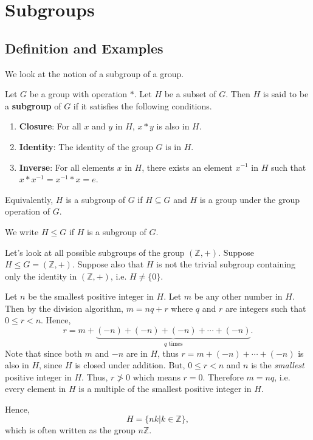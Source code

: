 \chapter{Subgroups}
\section{Definition and Examples}
We look at the notion of a subgroup of a group.
\begin{definition}
    Let $G$ be a group with operation $\ast$. Let $H$ be a subset of $G$. Then $H$ is said to be a \textbf{subgroup} of $G$ if it satisfies the following conditions.
    \begin{enumerate}
        \item \textbf{Closure}: For all $x$ and $y$ in $H$, $x \ast y$ is also in $H$.
        \item \textbf{Identity}: The identity of the group $G$ is in $H$.
        \item \textbf{Inverse}: For all elements $x$ in $H$, there exists an element $x^{-1}$ in $H$ such that $x \ast x^{-1} = x^{-1} \ast x = e$.
    \end{enumerate}
\end{definition}
\begin{remark}
    Equivalently, $H$ is a subgroup of $G$ if $H \subseteq G$ and $H$ is a group under the group operation of $G$.
\end{remark}
We write $H \leq G$ if $H$ is a subgroup of $G$.

\begin{example}
    Let's look at all possible subgroups of the group $(\mathbb{Z}, +)$. Suppose $H \leq G = (\mathbb{Z}, +)$. Suppose also that $H$ is not the trivial subgroup containing only the identity in $(\mathbb{Z}, +)$, i.e. $H \neq \{0\}$.

    Let $n$ be the smallest positive integer in $H$. Let $m$ be any other number in $H$. Then by the division algorithm, $m = nq + r$ where $q$ and $r$ are integers such that $0 \leq r < n$. Hence,
    \[
        r = m + \underbrace{(-n) +(-n) +(-n) + \cdots + (-n)}_{q\text{ times}}.
    \]
    Note that since both $m$ and $-n$ are in $H$, thus $r = m + (-n) + \cdots + (-n)$ is also in $H$, since $H$ is closed under addition. But, $0 \leq r < n$ and $n$ is the \textit{smallest} positive integer in $H$. Thus, $r \not> 0$ which means $r = 0$. Therefore $m = nq$, i.e. every element in $H$ is a multiple of the smallest positive integer in $H$.

    Hence,
    \[
    H = \{nk \vert k \in \mathbb{Z}\},
    \]
    which is often written as the group $n\mathbb{Z}$.
\end{example}

